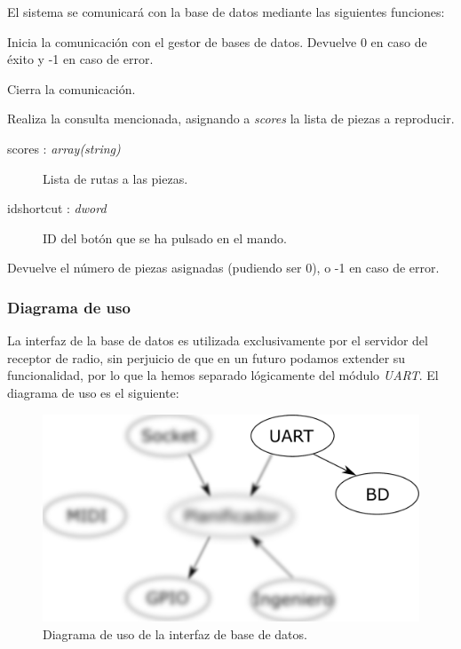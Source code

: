 El sistema se comunicará con la base de datos mediante las siguientes funciones:

\begin{description}[style=nextline]
	\item[db\_init () : \textit{dword}]
	Inicia la comunicación con el gestor de bases de datos. Devuelve 0 en caso de éxito y -1 en caso de error.
	
	\item[db\_destroy ()]
	Cierra la comunicación.
	
	\item[db\_query (scores, idshortcut) : \textit{dword}]
	Realiza la consulta mencionada, asignando a \textit{scores} la lista de piezas a reproducir.
	
	\begin{description}
		\item[scores : \textit{array(string)}] Lista de rutas a las piezas.
		\item[idshortcut : \textit{dword}] ID del botón que se ha pulsado en el mando.
	\end{description}
	
	Devuelve el número de piezas asignadas (pudiendo ser 0), o -1 en caso de error.
	
\end{description}

\subsubsection{Diagrama de uso}

La interfaz de la base de datos es utilizada exclusivamente por el servidor del receptor de radio, sin perjuicio de que en un futuro podamos extender su funcionalidad, por lo que la hemos separado lógicamente del módulo \textit{UART}. El diagrama de uso es el siguiente:

\smallskip

\begin{figure}[H]
	\noindent \begin{centering}
		\includegraphics[width=\linewidth/2]{capitulo4/daemon_bd}
		\par\end{centering}
	\smallskip
	\caption{\label{fig:daemon_bd} Diagrama de uso de la interfaz de base de datos.}
\end{figure} 

